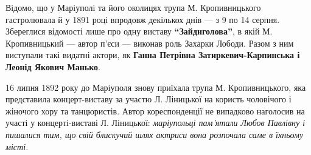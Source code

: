 Відомо, що у Маріуполі та його околицях трупа М. Кропивницького гастролювала й
у 1891 році впродовж декількох днів — з 9 по 14 серпня. Збереглися відомості
лише про одну виставу \textbf{\enquote{Зайдиголова}}, в якій М. Кропивницький — автор п'єси —
виконав роль Захарки Лободи. Разом з ним виступали такі видатні актори, як
\textbf{Ганна Петрівна Затиркевич-Карпинська і Леонід Якович Манько}.



16 липня 1892 року до Маріуполя знову приїхала трупа М. Кропивницького, яка
представила концерт-виставу за участю Л. Ліницької на користь чоловічого і
жіночого хору та танцюристів. Автор кореспонденції не випадково наголосив на
участі у концерті-виставі Л. Ліницької: \emph{маріупольці пам'ятали Любов Павлівну і
пишалися тим, що свій блискучий шлях актриси вона розпочала саме в їхньому
місті.}

